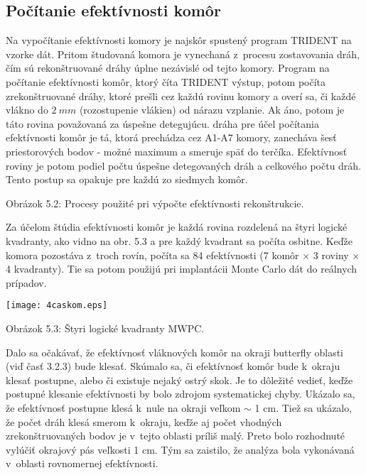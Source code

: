 \subsection{Počítanie efektívnosti komôr}
Na vypočítanie efektívnosti komory je najskôr spustený program TRIDENT na
vzorke  dát. Pritom študovaná komora je vynechaná z~procesu zostavovania
dráh, čím sú rekonštruované dráhy úplne nezávislé od tejto komory. Program
na počítanie efektívnosti komôr, ktorý číta TRIDENT výstup, potom počíta
zrekonštruované  dráhy, ktoré prešli cez každú rovinu komory a
overí sa, či každé vlákno do $2\: mm$ (rozostupenie vlákien) od nárazu
vzplanie. Ak áno, potom je táto rovina považovaná za úspešne detegujúcu.
 dráha pre účel počítania efektívnosti komôr je tá, ktorá 
prechádza cez A1-A7 komory, zanecháva  šesť priestorových bodov - možné
maximum a smeruje späť do terčíka. Efektívnosť roviny je potom podiel
počtu  úspešne detegovaných dráh a celkového počtu dráh. Tento postup sa
opakuje pre  každú zo siedmych komôr.

\newpage
\vspace*{3cm}
\hspace*{-0.3cm}
   
\vspace*{2cm}
\begin{center}
  Obrázok 5.2: Procesy použité pri výpočte efektívnosti rekonštrukcie.
\end{center}
\newpage

Za účelom štúdia efektívnosti komôr je každá rovina rozdelená na štyri
logické kvadranty, ako vidno na obr. 5.3 a pre každý kvadrant sa počíta
osbitne. Keďže komora pozostáva z~troch rovín, počíta sa 84 efektívnosti
(7 komôr $\times$ 3 roviny $\times$ 4 kvadranty). Tie sa potom
použijú pri implantácii Monte Carlo dát do reálnych prípadov.

\begin{center}
  \texttt{[image: 4caskom.eps]}
\end{center}
\begin{center}
  Obrázok 5.3: Štyri logické kvadranty MWPC.
\end{center}

Dalo sa očakávať, že efektívnosť vláknových komôr na okraji butterfly
oblasti (viď časť 3.2.3) bude klesať. Skúmalo sa, či efektívnosť komôr bude
k~okraju klesať postupne, alebo či existuje nejaký ostrý skok. Je to
dôležité vedieť, keďže postupné klesanie efektívnosti by bolo zdrojom
systematickej chyby.  Ukázalo sa, že efektívnosť postupne klesá k~nule na
okraji veľkom $\sim$ 1 cm. Tiež sa ukázalo, že počet dráh klesá smerom 
k~okraju, keďže aj počet vhodných zrekonštruovaných bodov je v~tejto oblasti
príliš malý. Preto bolo rozhodnuté vylúčiť  okrajový pás veľkosti 1 cm. Tým
sa zaistilo, že analýza bola vykonávaná v~oblasti rovnomernej efektívnosti.

